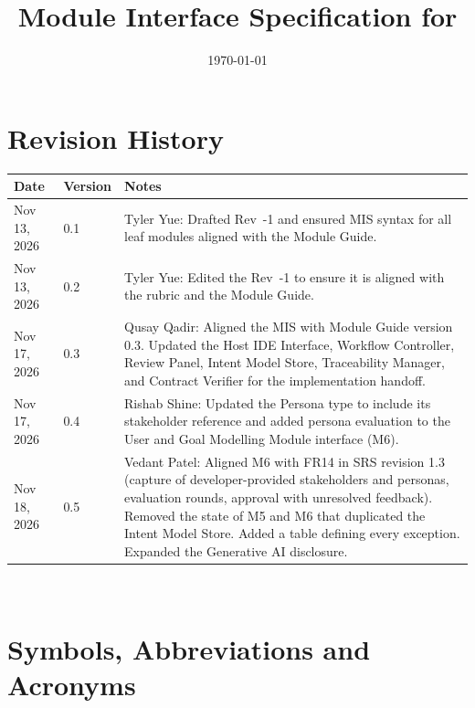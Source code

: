 \documentclass[12pt, titlepage]{article}
\begin{document}
\title{Module Interface Specification for \progname{}}
\author{\authname}
\date{\today}

\maketitle


\section{Revision History}

\begin{tabularx}{\textwidth}{p{3cm}p{2cm}X}
\toprule {\bf Date} & {\bf Version} & {\bf Notes}\\
\midrule
Nov 13, 2026 & 0.1 & Tyler Yue: Drafted Rev~-1 and ensured MIS syntax for all leaf modules
aligned with the Module Guide.\\
Nov 13, 2026 & 0.2 & Tyler Yue: Edited the Rev~-1 to ensure it is aligned with the rubric and the Module Guide.\\
Nov 17, 2026 & 0.3 & Qusay Qadir: Aligned the MIS with Module Guide version
0.3. Updated the Host IDE Interface, Workflow Controller, Review Panel, Intent Model Store, Traceability Manager, and Contract
Verifier for the implementation handoff.\\ 
Nov 17, 2026 & 0.4 & Rishab Shine: Updated the Persona type to include its
stakeholder reference and added persona evaluation to the User and Goal
Modelling Module interface (M6).\\
Nov 18, 2026 & 0.5 & Vedant Patel: Aligned M6 with FR14 in SRS revision 1.3
(capture of developer-provided stakeholders and personas, evaluation rounds,
approval with unresolved feedback). Removed the state of M5 and M6 that
duplicated the Intent Model Store. Added a table defining every exception.
Expanded the Generative AI disclosure.\\
\bottomrule
\end{tabularx}

~\newpage

\section{Symbols, Abbreviations and Acronyms}
\end{document}
